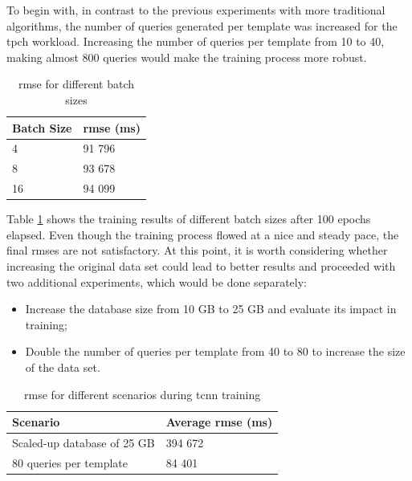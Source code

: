To begin with, in contrast to the previous experiments with more traditional algorithms, the number of queries generated per template was increased for the \gls{tpch} workload. Increasing the number of queries per template from 10 to 40, making almost 800 queries would make the training process more robust.

\begin{table}[H]
\centering
\begin{tabular*}{0.5\textwidth}{p{} p{}}
\hline
\textbf{Batch Size}              & \textbf{\gls{rmse} (ms)}  \\ \hline
4                                & 91 796                   \\
8                                & 93 678                   \\
16                               & 94 099                   \\ \hline
\end{tabular*}
\caption{\gls{rmse} for different batch sizes}
\label{tab:tcnn_results_1}
\end{table}

Table \ref{tab:tcnn_results_1} shows the training results of different batch sizes after 100 epochs elapsed. Even though the training process flowed at a nice and steady pace, the final \gls{rmse}s are not satisfactory. At this point, it is worth considering whether increasing the original data set could lead to better results and proceeded with two additional experiments, which would be done separately:

\begin{itemize}
    \item Increase the database size from 10 GB to 25 GB and evaluate its impact in training;
    \item Double the number of queries per template from 40 to 80 to increase the size of the data set.
\end{itemize}

\begin{table}[H]
\centering
\begin{tabular*}{0.8\textwidth}{p{} p{}}
\hline
\textbf{Scenario}                & \textbf{Average \gls{rmse} (ms)}  \\ \hline
Scaled-up database of 25 GB      & 394 672                     \\
80 queries per template                   & 84 401                      \\ \hline
\end{tabular*}
\caption{\gls{rmse} for different scenarios during \gls{tcnn} training}
\label{tab:tcnn_results_2}
\end{table}

